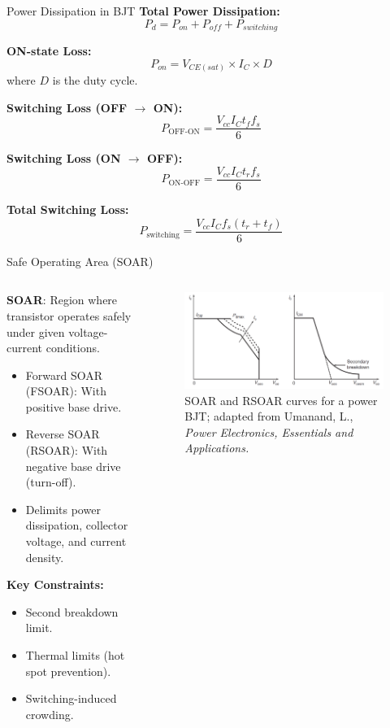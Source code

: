\begin{frame}{Power Dissipation in BJT}
\textbf{Total Power Dissipation:}
\[
P_d = P_{on} + P_{off} + P_{switching}
\]

\textbf{ON-state Loss:}
\[
P_{on} = V_{CE(sat)} \times I_C \times D
\]
where $D$ is the duty cycle.

\textbf{Switching Loss (OFF $\rightarrow$ ON):}
\[
P_{\text{OFF-ON}} = \frac{V_{cc} I_C t_f f_s}{6}
\]

\textbf{Switching Loss (ON $\rightarrow$ OFF):}
\[
P_{\text{ON-OFF}} = \frac{V_{cc} I_C t_r f_s}{6}
\]

\textbf{Total Switching Loss:}
\[
P_{\text{switching}} = \frac{V_{cc} I_C f_s (t_r + t_f)}{6}
\]
\end{frame}


\begin{frame}{Safe Operating Area (SOAR)}
      \begin{columns}
    \begin{column}{0.5\textwidth}
\textbf{SOAR}: Region where transistor operates safely under given voltage-current conditions.

\begin{itemize}
    \item Forward SOAR (FSOAR): With positive base drive.
    \item Reverse SOAR (RSOAR): With negative base drive (turn-off).
    \item Delimits power dissipation, collector voltage, and current density.
\end{itemize}

\textbf{Key Constraints:}
\begin{itemize}
    \item Second breakdown limit.
    \item Thermal limits (hot spot prevention).
    \item Switching-induced crowding.
\end{itemize}
    \end{column}

    \begin{column}{0.5\textwidth}
\begin{figure}
    \centering
    \includegraphics[width=0.8\linewidth]{fig/lec04/BJT_SOAR_RSOAR.png}
    \caption{SOAR and RSOAR curves for a power BJT; adapted from Umanand, L., \textit{Power Electronics, Essentials and Applications.}}
\end{figure}
    \end{column}
\end{columns}
\end{frame}


